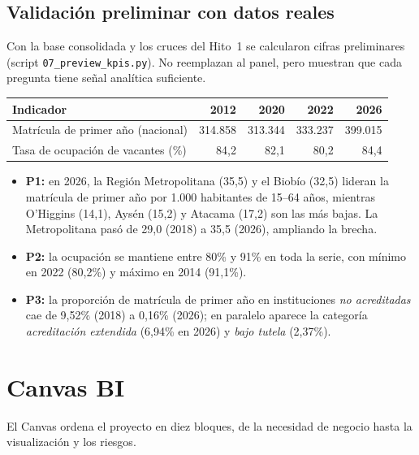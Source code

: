 \documentclass[11pt,a4paper]{article}
\begin{document}
\subsection{Validaci\'on preliminar con datos reales}
Con la base consolidada y los cruces del Hito~1 se calcularon cifras preliminares (script \texttt{07\_preview\_kpis.py}). No reemplazan al panel, pero muestran que cada pregunta tiene se\~nal anal\'itica suficiente.

\begin{center}
\begin{tabular}{@{}lrrrr@{}}
\toprule
\textbf{Indicador} & \textbf{2012} & \textbf{2020} & \textbf{2022} & \textbf{2026} \\
\midrule
Matr\'icula de primer a\~no (nacional) & 314.858 & 313.344 & 333.237 & 399.015 \\
Tasa de ocupaci\'on de vacantes (\%) & 84,2 & 82,1 & 80,2 & 84,4 \\
\bottomrule
\end{tabular}
\end{center}

\begin{itemize}
    \item \textbf{P1:} en 2026, la Regi\'on Metropolitana (35,5) y el Biob\'io (32,5) lideran la matr\'icula de primer a\~no por 1.000 habitantes de 15--64 a\~nos, mientras O'Higgins (14,1), Ays\'en (15,2) y Atacama (17,2) son las m\'as bajas. La Metropolitana pas\'o de 29,0 (2018) a 35,5 (2026), ampliando la brecha.
    \item \textbf{P2:} la ocupaci\'on se mantiene entre 80\% y 91\% en toda la serie, con m\'inimo en 2022 (80,2\%) y m\'aximo en 2014 (91,1\%).
    \item \textbf{P3:} la proporci\'on de matr\'icula de primer a\~no en instituciones \emph{no acreditadas} cae de 9,52\% (2018) a 0,16\% (2026); en paralelo aparece la categor\'ia \emph{acreditaci\'on extendida} (6,94\% en 2026) y \emph{bajo tutela} (2,37\%).
\end{itemize}

\section{Canvas BI}
El Canvas ordena el proyecto en diez bloques, de la necesidad de negocio hasta la visualizaci\'on y los riesgos.
\end{document}
